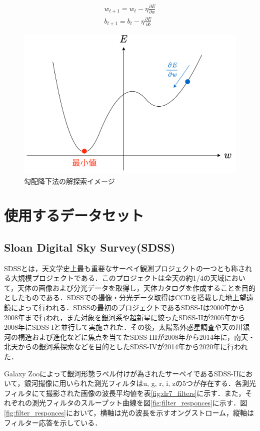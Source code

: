 \documentclass[a4j, 11pt]{jreport}
\begin{document}
\begin{equation}
  \begin{array}{l}
    w_{t+1} = w_t - \eta \frac{\partial E}{\partial w} \\
    b_{t+1} = b_t - \eta \frac{\partial E}{\partial b}
  \end{array}
  \label{eq:gradient}
\end{equation}

\begin{figure}[H]
 \centering
 \includegraphics[width=0.7\hsize, keepaspectratio]{images/drawio/gradient.png}
 \caption{勾配降下法の解探索イメージ}
 \label{fig:gradient}
\end{figure}





\newpage
\chapter{使用するデータセット}
\section{Sloan Digital Sky Survey(SDSS)}
SDSSとは，天文学史上最も重要なサーベイ観測プロジェクトの一つとも称される大規模プロジェクトである．このプロジェクトは全天の約1/4の天域において，天体の画像および分光データを取得し，天体カタログを作成することを目的としたものである．SDSSでの撮像・分光データ取得はCCDを搭載した地上望遠鏡によって行われる．SDSSの最初のプロジェクトであるSDSS-I\cite{York2000}は2000年から2008年まで行われ，また対象を銀河系や超新星に絞ったSDSS-II\cite{York2000}が2005年から2008年にSDSS-Iと並行して実施された．その後，太陽系外惑星調査や天の川銀河の構造および進化などに焦点を当てたSDSS-III\cite{Eisenstein2011}が2008年から2014年に，南天・北天からの銀河系探索などを目的としたSDSS-IV\cite{Blanton2017}が2014年から2020年に行われた．

Galaxy Zooによって銀河形態ラベル付けが為されたサーベイであるSDSS-IIにおいて，銀河撮像に用いられた測光フィルタはu, g, r, i, zの5つが存在する．各測光フィルタにて撮影された画像の波長平均値を表\ref{fig:dr7_filters}に示す．また，それぞれの測光フィルタのスループット曲線を図\ref{fig:filter_responces}に示す．図\ref{fig:filter_responces}において，横軸は光の波長を示すオングストローム，縦軸はフィルター応答を示している．
\end{document}
